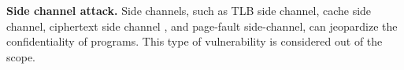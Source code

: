 \textbf{Side channel attack.} Side channels, such as TLB side channel\cite*{217454}, cache side channel\cite*{7163050}, ciphertext side channel\cite*{274707} , and page-fault side-channel\cite*{236278}, can jeopardize the confidentiality of programs.  This type of vulnerability is considered out of the scope.








